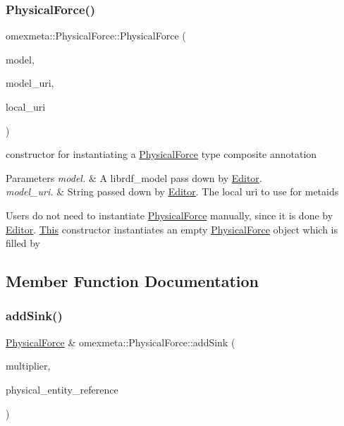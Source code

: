 \subsubsection{\texorpdfstring{Physical\+Force()}{PhysicalForce()}\hspace{0.1cm}{\footnotesize\ttfamily [3/3]}}
{\footnotesize\ttfamily omexmeta\+::\+Physical\+Force\+::\+Physical\+Force (\begin{DoxyParamCaption}\item[{librdf\+\_\+model $\ast$}]{model,  }\item[{const std\+::string \&}]{model\+\_\+uri,  }\item[{const std\+::string \&}]{local\+\_\+uri }\end{DoxyParamCaption})\hspace{0.3cm}{\ttfamily [explicit]}}



constructor for instantiating a \hyperlink{classomexmeta_1_1PhysicalForce}{Physical\+Force} type composite annotation 


\begin{DoxyParams}{Parameters}
{\em model.} & A librdf\+\_\+model pass down by \hyperlink{classomexmeta_1_1Editor}{Editor}. \\
\hline
{\em model\+\_\+uri.} & String passed down by \hyperlink{classomexmeta_1_1Editor}{Editor}. The local uri to use for metaids\\
\hline
\end{DoxyParams}
Users do not need to instantiate \hyperlink{classomexmeta_1_1PhysicalForce}{Physical\+Force} manually, since it is done by \hyperlink{classomexmeta_1_1Editor}{Editor}. \hyperlink{classThis}{This} constructor instantiates an empty \hyperlink{classomexmeta_1_1PhysicalForce}{Physical\+Force} object which is filled by 

\subsection{Member Function Documentation}
\mbox{\label{classomexmeta_1_1PhysicalForce_a8ec5e262b82526ac914d8c7f10b6c2f1}} 
\subsubsection{\texorpdfstring{add\+Sink()}{addSink()}}
{\footnotesize\ttfamily \hyperlink{classomexmeta_1_1PhysicalForce}{Physical\+Force} \& omexmeta\+::\+Physical\+Force\+::add\+Sink (\begin{DoxyParamCaption}\item[{int}]{multiplier,  }\item[{const std\+::string \&}]{physical\+\_\+entity\+\_\+reference }\end{DoxyParamCaption})}



